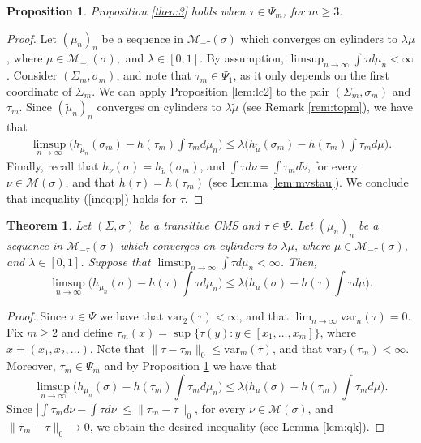 \documentclass[letterpaper,11pt]{amsart}
\theoremstyle{plain}
\newtheorem{theorem}{Theorem}[section]
\theoremstyle{plain}
\newtheorem{proposition}{Proposition}[subsection]
\theoremstyle{definition}
\theoremstyle{remark}
\def\M{{\mathcal M}}
\begin{document}
\begin{proposition}\label{toF_n2}   Proposition \ref{theo:3} holds when $\tau\in\Psi_m$, for $m\ge3$.
\end{proposition}
\begin{proof} 
Let $(\mu_n)_n$ be a sequence in $\M_{-\tau}(\sigma)$ which converges on cylinders to $\lambda\mu$, where $\mu\in \M_{-\tau}(\sigma),$ and $\lambda\in [0,1]$. By assumption, $\limsup_{n\to\infty}\int \tau d\mu_n<\infty$. Consider $(\Sigma_m,\sigma_m)$, and note that $\tau_m\in\Psi_1$, as it only depends on the first coordinate of $\Sigma_m$. We can apply Proposition \ref{lem:lc2} to the pair $(\Sigma_m,\sigma_m)$ and $\tau_m$. Since $(\tilde{\mu}_n)_n$ converges on cylinders to $\lambda\tilde{\mu}$ (see Remark \ref{rem:topm}), we have that
\begin{align*}\limsup_{n\to\infty}\big(h_{\tilde{\mu}_n}(\sigma_m)-h(\tau_m)\int \tau_m d{\tilde{\mu}_n}\big)\le \lambda\big(h_{\tilde{\mu}}(\sigma_m)-h(\tau_m)\int \tau_m d{\tilde{\mu}}\big).\end{align*}
Finally, recall that  $h_\nu(\sigma)=h_{\tilde{\nu}}(\sigma_m)$, and $\int \tau d\nu=\int \tau_m d\tilde{\nu}$, for every $\nu\in \M(\sigma)$, and that $h(\tau)=h(\tau_m)$ (see Lemma \ref{lem:mvstau}). We conclude that inequality (\ref{ineq:p}) holds for $\tau$. 
\end{proof}

\begin{theorem}\label{theo:4}  Let $(\Sigma,\sigma)$ be a transitive CMS and $\tau\in\Psi$. Let $(\mu_n)_n$ be a sequence  in $\M_{-\tau}(\sigma)$ which converges on cylinders to $\lambda\mu$, where $\mu\in \M_{-\tau}(\sigma)$, and $\lambda\in [0,1]$. Suppose that $\limsup_{n\to\infty}\int \tau d\mu_n<\infty$. Then,
$$\limsup_{n\to\infty}\big(h_{\mu_n}(\sigma)-h(\tau)\int \tau  d\mu_n\big)\le \lambda\big(h_{\mu}(\sigma)-h(\tau)\int \tau d\mu\big).$$
\end{theorem}
\begin{proof} Since $\tau\in \Psi$ we have that $\text{var}_2(\tau)<\infty$, and that $\lim_{n\to\infty}\text{var}_n(\tau)=0$. Fix $m\ge 2$ and define $\tau_m(x)=\sup\{\tau(y):y\in[x_1,\ldots, x_{m}]\}$, where $x=(x_1,x_2,\ldots)$. Note that $\|\tau-\tau_m\|_0\le \text{var}_m(\tau)$, and that $\text{var}_2(\tau_m)<\infty$. Moreover, $\tau_m\in\Psi_m$ and by Proposition \ref{toF_n2}  we have that 
$$\limsup_{n\to\infty}\big(h_{\mu_n}(\sigma)-h(\tau_m)\int \tau_m d\mu_n\big)\le \lambda\big(h_{\mu}(\sigma)-h(\tau_m)\int \tau_m d\mu\big).$$
Since $|\int \tau_m d\nu-\int \tau d\nu|\le \|\tau_m-\tau\|_0$, for every $\nu\in \M(\sigma)$, and $\|\tau_m-\tau\|_0\to 0$, we obtain the desired inequality (see Lemma \ref{lem:qk}).
\end{proof}
\end{document}
